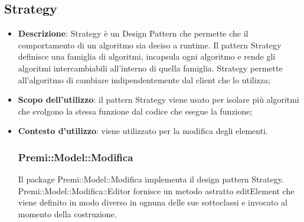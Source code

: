 {	\subsection{Strategy}{
		\begin{itemize}
			\item \textbf{Descrizione}: Strategy è un Design Pattern che permette che il comportamento di un algoritmo sia deciso a runtime.
			Il pattern Strategy definisce una famiglia di algoritmi, incapsula ogni algoritmo e rende gli algoritmi intercambiabili all'interno di quella famiglia.
			Strategy permette all'algoritmo di cambiare indipendentemente dal client che lo utilizza;\\
			\item \textbf{Scopo dell’utilizzo}: il pattern Strategy viene usato per isolare più algoritmi che svolgono la stessa funzione dal codice che esegue la funzione;
			\item \textbf{Contesto d’utilizzo}: viene utilizzato per la modifica degli elementi.
			\subsubsection{Premi::Model::Modifica}{
			Il package Premi::Model::Modifica implementa il design pattern Strategy.
			Premi::Model::Modifica::Editor fornisce un metodo astratto editElement che viene definito in modo diverso in ognuna delle sue sottoclassi e invocato al momento della costruzione.
			}
		\end{itemize}
	}
}